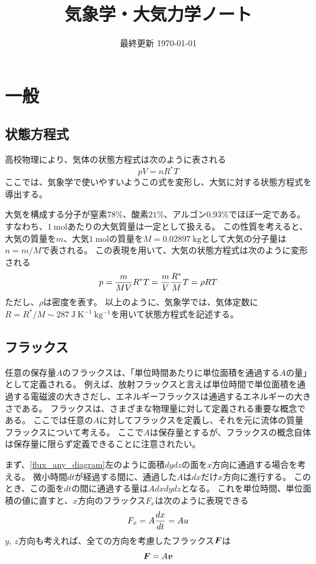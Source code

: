 \documentclass[a4paper,11pt,platex]{jsarticle}
\title{気象学・大気力学ノート}
\date{最終更新 \today}
\numberwithin{equation}{section}
\begin{document}
\maketitle

\clearpage
\tableofcontents
\clearpage
{}


\section{一般}


\subsection{状態方程式}
高校物理により、気体の状態方程式は次のように表される
\begin{equation}
    pV = nR^*T
\end{equation}
ここでは、気象学で使いやすいようこの式を変形し、大気に対する状態方程式を導出する。

大気を構成する分子が窒素$78\%$、酸素$21\%$、アルゴン$0.93\%$でほぼ一定である。
すなわち、$1 \: \mathrm{mol}$あたりの大気質量は一定として扱える。
この性質を考えると、大気の質量を$m$、大気$1 \: \mathrm{mol}$の質量を$M=0.02897 \:\mathrm{kg}$として大気の分子量は$n=m/M$で表される。
この表現を用いて、大気の状態方程式は次のように変形される
\begin{equation}
    \label{equation_of_state}
    p = {m \over MV} R^* T
      = {m \over V} {R^* \over M} T
      = \rho RT
\end{equation}
ただし、$\rho$は密度を表す。
以上のように、気象学では、気体定数に$R=R^*/M \sim 287 \: \mathrm{J \: K^{-1} \: kg^{-1}}$を用いて状態方程式を記述する。


\subsection{フラックス}
任意の保存量$A$のフラックスは、「単位時間あたりに単位面積を通過する$A$の量」として定義される。
例えば、放射フラックスと言えば単位時間で単位面積を通過する電磁波の大きさだし、エネルギーフラックスは通過するエネルギーの大きさである。
フラックスは、さまざまな物理量に対して定義される重要な概念である。
ここでは任意の$A$に対してフラックスを定義し、それを元に流体の質量フラックスについて考える。
ここで$A$は保存量とするが、フラックスの概念自体は保存量に限らず定義できることに注意されたい。

まず、\autoref{flux_any_diagram}左のように面積$dydz$の面を$x$方向に通過する場合を考える。
微小時間$dt$が経過する間に、通過した$A$は$dx$だけ$x$方向に進行する。
このとき、この面を$dt$の間に通過する量は$Adxdydz$となる。
これを単位時間、単位面積の値に直すと、$x$方向のフラックス$F_x$は次のように表現できる
\begin{equation}
    F_x = A{dx \over dt} = Au
\end{equation}
$y$, $z$方向も考えれば、全ての方向を考慮したフラックス$\vb*{F}$は
\begin{equation}
    \vb*{F} = A\vb*{v}
\end{equation}
\end{document}
